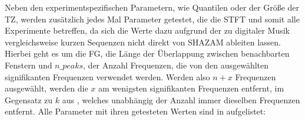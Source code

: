         Neben den experimentspezifischen Parametern, wie Quantilen oder der Größe der \acl{TZ}, werden zusätzlich jedes Mal Parameter getestet, die die \ac{STFT} und somit alle Experimente betreffen, da sich die Werte dazu aufgrund der zu digitaler Musik vergleichsweise kurzen Sequenzen nicht direkt von SHAZAM ableiten lassen. Hierbei geht es um die \ac{FG}, die Länge der Überlappung zwischen benachbarten Fenstern und $n\_peaks$, der Anzahl Frequenzen, die von den ausgewählten signifikanten Frequenzen verwendet werden. Werden also $n+x$ Frequenzen ausgewählt, werden die $x$ am wenigsten signifikanten Frequenzen entfernt, im Gegensatz zu $k$ aus , welches unabhängig der Anzahl immer dieselben Frequenzen entfernt. Alle Parameter mit ihren getesteten Werten sind in  aufgelistet:
        
